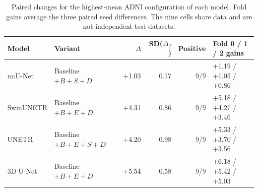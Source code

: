 \documentclass[12pt,a4paper]{article}
\begin{document}
\FloatBarrier
\begin{table}[htbp]
\centering\footnotesize{}
\setlength{\tabcolsep}{5pt}
\renewcommand{\arraystretch}{1.15}
\begin{tabular}{@{}llrrrl@{}}
\hline
Model & Variant & $\Delta$ & SD($\Delta_f$) & Positive & Fold 0 / 1 / 2 gains \\
\hline
nnU-Net & Baseline $+B+S+D$ & +1.03 & 0.17 & 9/9 & +1.19 / +1.05 / +0.86 \\
SwinUNETR & Baseline $+B+E+D$ & +4.31 & 0.86 & 9/9 & +5.18 / +4.27 / +3.46 \\
UNETR & Baseline $+B+E+S+D$ & +4.20 & 0.98 & 9/9 & +5.33 / +3.70 / +3.56 \\
3D U-Net & Baseline $+B+E+D$ & +5.54 & 0.58 & 9/9 & +6.18 / +5.42 / +5.03 \\
\hline
\end{tabular}
\caption{Paired changes for the highest-mean ADNI configuration of each model. Fold gains average the three paired seed differences. The nine cells share data and are not independent test datasets.}
\label{tab:adni-noaug-best}
\end{table}
\FloatBarrier
\end{document}

